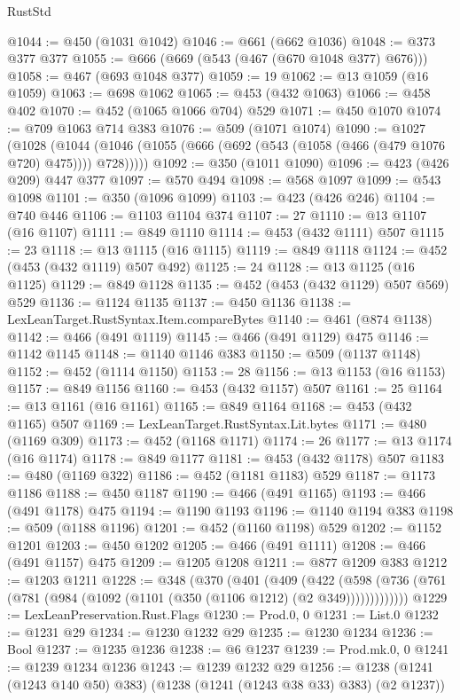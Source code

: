 \begin{lexlean}{RustStd}
\begin{coremodule}
@1044 := @450 (@1031 @1042)
@1046 := @661 (@662 @1036)
@1048 := @373 @377 @377
@1055 := @666 (@669 (@543 (@467 (@670 @1048 @377) @676)))
@1058 := @467 (@693 @1048 @377)
@1059 := 19
@1062 := @13 @1059 (@16 @1059)
@1063 := @698 @1062
@1065 := @453 (@432 @1063)
@1066 := @458 @402
@1070 := @452 (@1065 @1066 @704) @529
@1071 := @450 @1070
@1074 := @709 @1063 @714 @383
@1076 := @509 (@1071 @1074)
@1090 := @1027
    (@1028 (@1044 (@1046 (@1055 (@666 (@692 (@543 (@1058 (@466 (@479 @1076 @720) @475)))) @728)))))
@1092 := @350 (@1011 @1090)
@1096 := @423 (@426 @209) @447 @377
@1097 := @570 @494
@1098 := @568 @1097
@1099 := @543 @1098
@1101 := @350 (@1096 @1099)
@1103 := @423 (@426 @246)
@1104 := @740 @446
@1106 := @1103 @1104 @374
@1107 := 27
@1110 := @13 @1107 (@16 @1107)
@1111 := @849 @1110
@1114 := @453 (@432 @1111) @507
@1115 := 23
@1118 := @13 @1115 (@16 @1115)
@1119 := @849 @1118
@1124 := @452 (@453 (@432 @1119) @507 @492)
@1125 := 24
@1128 := @13 @1125 (@16 @1125)
@1129 := @849 @1128
@1135 := @452 (@453 (@432 @1129) @507 @569) @529
@1136 := @1124 @1135
@1137 := @450 @1136
@1138 := LexLeanTarget.RustSyntax.Item.compareBytes
@1140 := @461 (@874 @1138)
@1142 := @466 (@491 @1119)
@1145 := @466 (@491 @1129) @475
@1146 := @1142 @1145
@1148 := @1140 @1146 @383
@1150 := @509 (@1137 @1148)
@1152 := @452 (@1114 @1150)
@1153 := 28
@1156 := @13 @1153 (@16 @1153)
@1157 := @849 @1156
@1160 := @453 (@432 @1157) @507
@1161 := 25
@1164 := @13 @1161 (@16 @1161)
@1165 := @849 @1164
@1168 := @453 (@432 @1165) @507
@1169 := LexLeanTarget.RustSyntax.Lit.bytes
@1171 := @480 (@1169 @309)
@1173 := @452 (@1168 @1171)
@1174 := 26
@1177 := @13 @1174 (@16 @1174)
@1178 := @849 @1177
@1181 := @453 (@432 @1178) @507
@1183 := @480 (@1169 @322)
@1186 := @452 (@1181 @1183) @529
@1187 := @1173 @1186
@1188 := @450 @1187
@1190 := @466 (@491 @1165)
@1193 := @466 (@491 @1178) @475
@1194 := @1190 @1193
@1196 := @1140 @1194 @383
@1198 := @509 (@1188 @1196)
@1201 := @452 (@1160 @1198) @529
@1202 := @1152 @1201
@1203 := @450 @1202
@1205 := @466 (@491 @1111)
@1208 := @466 (@491 @1157) @475
@1209 := @1205 @1208
@1211 := @877 @1209 @383
@1212 := @1203 @1211
@1228 := @348
    (@370
      (@401
        (@409
          (@422
            (@598 (@736 (@761 (@781 (@984 (@1092 (@1101 (@350 (@1106 @1212) (@2 @349)))))))))))))
@1229 := LexLeanPreservation.Rust.Flags
@1230 := Prod.{0, 0}
@1231 := List.{0}
@1232 := @1231 @29
@1234 := @1230 @1232 @29
@1235 := @1230 @1234
@1236 := Bool
@1237 := @1235 @1236
@1238 := @6 @1237
@1239 := Prod.mk.{0, 0}
@1241 := @1239 @1234 @1236
@1243 := @1239 @1232 @29
@1256 := @1238 (@1241 (@1243 @140 @50) @383) (@1238 (@1241 (@1243 @38 @33) @383) (@2 @1237))

\end{coremodule}
\end{lexlean}
